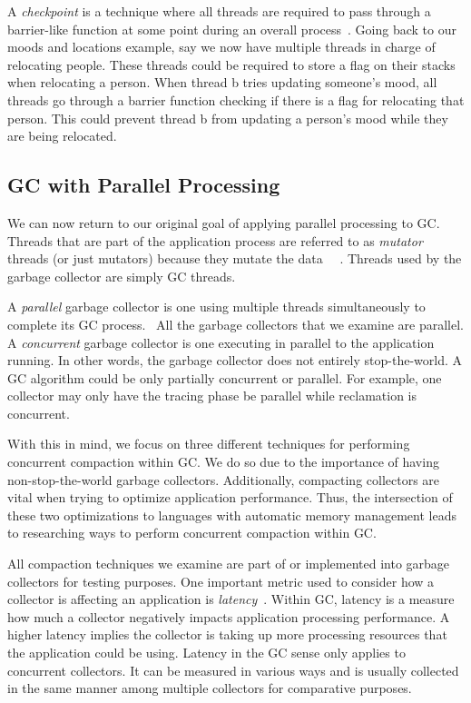 \documentclass{sig-alternate}
\begin{document}
A \emph{checkpoint} is a technique
where all threads are required to pass through a barrier-like function at some point
during an overall process~\cite{Tene:C4}. Going back to our moods and locations example, say we
now have multiple threads in charge of relocating people. These threads
could be required to store a flag on their stacks when relocating a person.
When thread b tries updating someone's mood, all threads go through
a barrier function checking if there is a flag for relocating that person. This
could prevent thread b from updating a person's mood while they are being relocated.


\subsection{GC with Parallel Processing}
\label{sec:parallelProcessingGarbageCollection}

We can now return to our original goal of applying parallel processing to GC.
Threads that are part of the application process are referred to as \emph{mutator}
threads (or just mutators) because they mutate the data~\cite{Tene:C4}~\cite{Iyengar:Collie}
\cite{Osterlund:FPP}. Threads used by the garbage collector are simply GC threads.

A \emph{parallel} garbage collector is one using
multiple threads simultaneously to complete its GC process.~\cite{Puffitsch:background}
All the garbage collectors that we examine are parallel. A \emph{concurrent} garbage
collector is one executing in parallel to the application running. In other 
words, the garbage collector does not entirely stop-the-world. A GC algorithm
could be only partially concurrent or parallel. For example, one collector may
only have the tracing phase be parallel while reclamation is concurrent.

With this in mind, we focus on three different techniques for performing
concurrent compaction within GC. We do so due to the importance 
of having non-stop-the-world garbage collectors. Additionally, compacting
collectors are vital when trying to optimize application performance. Thus,
the intersection of these two optimizations to languages with automatic memory management leads
to researching ways to perform concurrent compaction within GC.

All compaction techniques we examine are part of or implemented into garbage
collectors for testing purposes. One important metric used to consider
how a collector is affecting an application is \emph{latency}~\cite{Lindblom:2011}.
Within GC, latency is a measure how much a collector negatively impacts
application processing performance. A higher latency implies the collector
is taking up more processing resources that the application could be using.
Latency in the GC sense only applies to concurrent collectors. It 
can be measured in various ways and is usually collected in the same manner
among multiple collectors for comparative purposes.
\end{document}
